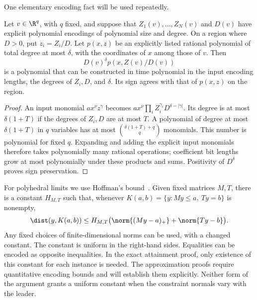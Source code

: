 \begin{samepage}
One elementary encoding fact will be used repeatedly.
\begin{lemma}\label{lem:substitution}
Let $v\in\R^q$, with $q$ fixed, and suppose that $Z_1(v),\ldots,Z_N(v)$
and $D(v)$ have explicit polynomial encodings of polynomial size and degree.
On a region where $D>0$, put $z_i=Z_i/D$. Let $p(x,z)$ be an explicitly
listed rational polynomial of total degree at most $\delta$, with the
coordinates of $x$ among those of $v$. Then
\[
             D(v)^\delta p(x,Z(v)/D(v))
\]
is a polynomial that can be constructed in time polynomial in the input
encoding lengths, the degrees of $Z_i,D$, and $\delta$. Its sign agrees
with that of $p(x,z)$ on the region.
\end{lemma}
\end{samepage}
\begin{proof}
An input monomial $a x^\nu z^\gamma$ becomes
$a x^\nu\prod_iZ_i^{\gamma_i}D^{\delta-|\gamma|}$.
Its degree is at most $\delta(1+T)$ if the degrees of $Z_i,D$ are at
most $T$. A polynomial of degree at most $\delta(1+T)$ in $q$ variables
has at most $\binom{\delta(1+T)+q}{q}$ monomials. This number is
polynomial for fixed $q$. Expanding and adding the explicit input
monomials therefore takes polynomially many rational operations;
coefficient bit lengths grow at most polynomially under these products
and sums. Positivity of $D^\delta$ proves sign preservation.
\end{proof}

For polyhedral limits we use Hoffman's bound~\cite{Hoffman1952}.
Given fixed matrices $M,T$, there is a constant $H_{M,T}$ such that,
whenever $K(a,b)=\{y:My\le a,\ Ty=b\}$ is nonempty,
\begin{equation}\label{eq:hoffman}
 \dist(y,K(a,b))\le H_{M,T}
          \bigl(\norm{(My-a)_+}+\norm{Ty-b}\bigr).
\end{equation}
Any fixed choices of finite-dimensional norms can be used, with a changed
constant. The constant is uniform in the right-hand sides. Equalities
can be encoded as opposite inequalities. In the exact attainment proof,
only existence of this constant for each instance is needed. The
approximation proofs require quantitative encoding bounds and will
establish them explicitly. Neither form of the argument grants a uniform
constant when the constraint normals vary with the leader.

